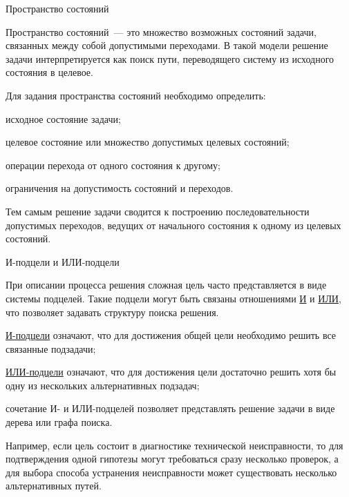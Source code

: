 \begin{frame}{Пространство состояний}
	\topline
	\justifying
	
	\footnotesize
	\vspace{10mm}
	
	Пространство состояний~--- это множество возможных состояний задачи, связанных между собой допустимыми переходами. В такой модели решение задачи интерпретируется как поиск пути, переводящего систему из исходного состояния в целевое.
	
	\vspace{2mm}
	
	Для задания пространства состояний необходимо определить:
	\begin{textitemize}
		\item исходное состояние задачи;
		\item целевое состояние или множество допустимых целевых состояний;
		\item операции перехода от одного состояния к другому;
		\item ограничения на допустимость состояний и переходов.
	\end{textitemize}
	
	\vspace{2mm}
	
	Тем самым решение задачи сводится к построению последовательности допустимых переходов, ведущих от начального состояния к одному из целевых состояний.
\end{frame}

\begin{frame}{И-подцели и ИЛИ-подцели}
	\topline
	\justifying
	
	\footnotesize
	\vspace{10mm}
	
	При описании процесса решения сложная цель часто представляется в виде системы подцелей. Такие подцели могут быть связаны отношениями \uline{И} и \uline{ИЛИ}, что позволяет задавать структуру поиска решения.
	
	\vspace{2mm}
	
	\begin{textitemize}
		\item \uline{И-подцели} означают, что для достижения общей цели необходимо решить все связанные подзадачи;
		\item \uline{ИЛИ-подцели} означают, что для достижения цели достаточно решить хотя бы одну из нескольких альтернативных подзадач;
		\item сочетание И- и ИЛИ-подцелей позволяет представлять решение задачи в виде дерева или графа поиска.
	\end{textitemize}
	
	\vspace{2mm}
	
	Например, если цель состоит в диагностике технической неисправности, то для подтверждения одной гипотезы могут требоваться сразу несколько проверок, а для выбора способа устранения неисправности может существовать несколько альтернативных путей.
\end{frame}

